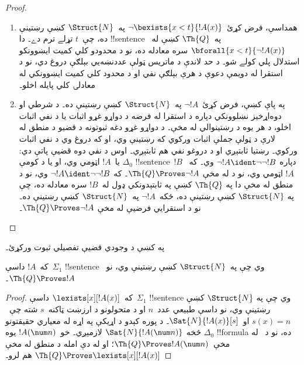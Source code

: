 \documentclass[../../../include/open-logic-section]{subfiles}
\begin{document}
\begin{proof}
\begin{enumerate}
رښتينې ده، چې~$t$ تړلے ترم دے۔ دا !!{sentence} له
!!{sentence}~$\bexists{x<t}{\lnot !A(x)}$ سره معادله ده، او دا معادله په
$\Th{Q}$ کښې استنتاجېدے شي؛ نو د محدودو وجودي کمیت ايښوونکو
استدلال پلي کولے شو۔ په دې حالت کښې د شاهد دپاره د استقرا له دويمې دعوې کار اخلو، ځکه د ماتريس دغه بېلګه دروغ ده۔
%
\item همداسې، فرض کړئ~$\lnot \bexists{x<t}{!A(x)}$ په~$\Struct{N}$
کښې رښتينې ده، چې~$t$ تړلے ترم دے۔ دا !!{sentence} په~$\Th{Q}$ کښې
له~$\bforall{x<t}{\lnot!A(x)}$ سره معادله ده، نو د محدودو کلي کمیت
ايښوونکو استدلال پلي کولے شو۔ د حد لاندې د ماتريس ټولې عددنښه‌يي بېلګې دروغ دي، نو د استقرا له دويمې دعوې د هرې بېلګې نفي او د محدود کلي کمیت ايښوونکي له معادلۍ کلي پايله اخلو۔
%
\item په پاې کښې، فرض کړئ~$\lnot !A$ په~$\Struct{N}$ کښې رښتينې
ده۔ د شرطي او دوه‌اړخيز نښلوونکي دپاره د استقرا له فرضه د دواړو غړو اثبات يا د نفي اثبات اخلو، د هر يوه د رښتينوالي له مخې۔ د دواړو غړو دغه ثبوتونه د قضيو د منطق له لارې د ټولې جملې اثبات ورکوي که رښتينې وي، او که دروغ وي د نفي اثبات ورکوي۔ رښتيا ثابتېږي او د دروغو نفي هم ثابتېږي۔ اوس د نفي دوه قضيې پاتې دي: يا~$!A$ اټومي وي، او يا د کومې
$\Delta_0$ !!{sentence}~$!B$ دپاره
$\lnot !A \ident \lnot\lnot !B$ وي۔ که~$!A$ اټومي وي، نو د
 له مخې
$\Th{Q} \Proves \lnot !A$۔ که
$\lnot !A \ident \lnot\lnot !B$ وي، نو د منطق له مخې دا په
$\Th{Q}$ کښې په ثابتېدونکي ډول له~$!B$ سره معادله ده، چې په
$\Struct{N}$ کښې رښتينې ده، ځکه~$\lnot !A$ په~$\Struct{N}$ کښې
رښتينې ده۔ نو د استقرايي فرضيې له مخې
$\Th{Q} \Proves \lnot !A$۔
\end{enumerate}
\end{proof}

\begin{prob}
په  کښې د وجودي قضيې تفصيلي ثبوت
ورکړئ۔
\end{prob}

\begin{thm}
که~$!A$ داسې~$\Sigma_1$ !!{sentence} وي چې په~$\Struct{N}$ کښې
رښتينې وي، نو~$\Th{Q} \Proves !A$۔
\end{thm}

\begin{proof}
که~$\lexists[x][!A(x)]$ داسې~$\Sigma_1$ !!{sentence} وي چې په
$\Struct{N}$ کښې رښتينې وي، نو داسې طبيعي عدد~$n$ او د متحولونو
د ارزښت ټاکنه~$s$ شته چې~$s(x) = n$ او~$\Sat{N}{!A(x)}[s]$۔ د
پوره کېدو د اړيکې په اړه له معياري حقيقتونو څخه
$\Sat{N}{!A(\num n)}$ لازمېږي۔
خو~$!A(\num n)$ يوه
$\Delta_0$ !!{formula} ده، نو د~ له
مخې~$\Th{Q} \Proves !A(\num n)$؛ او له دې امله د منطق له مخې
$\Th{Q} \Proves \lexists[x][!A(x)]$ هم لرو۔
\end{proof}
\end{document}
